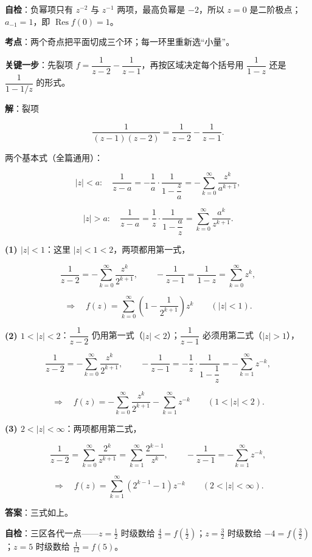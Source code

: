 \documentclass[11pt]{ctexart}
\renewcommand{\qbreak}{\needspace{0.45\textheight}}
\begin{document}
\textbf{自检}：负幂项只有 $z^{-2}$ 与 $z^{-1}$ 两项，最高负幂是 $-2$，所以 $z=0$ 是二阶极点；$a_{-1}=1$，即 $\operatorname{Res}f(0)=1$。

\qbreak
{}

\textbf{考点}：两个奇点把平面切成三个环；每一环里重新选“小量”。

\textbf{关键一步}：先裂项 $f=\dfrac{1}{z-2}-\dfrac{1}{z-1}$，再按区域决定每个括号用 $\dfrac{1}{1-z}$ 还是 $\dfrac{1}{1-1/z}$ 的形式。

\textbf{解}：裂项

\[ \frac{1}{(z-1)(z-2)}=\frac{1}{z-2}-\frac{1}{z-1} . \]

两个基本式（全篇通用）：

\[ |z|<a:\quad\frac{1}{z-a}=-\frac1a\cdot\frac{1}{1-\dfrac za}=-\sum_{k=0}^{\infty}\frac{z^k}{a^{k+1}} , \]

\[ |z|>a:\quad\frac{1}{z-a}=\frac1z\cdot\frac{1}{1-\dfrac az}=\sum_{k=0}^{\infty}\frac{a^k}{z^{k+1}} . \]

\textbf{(1) $|z|<1$}：这里 $|z|<1<2$，两项都用第一式，

\[ \frac{1}{z-2}=-\sum_{k=0}^{\infty}\frac{z^k}{2^{k+1}},\qquad -\frac{1}{z-1}=\frac{1}{1-z}=\sum_{k=0}^{\infty}z^k , \]

\[ \Longrightarrow\quad f(z)=\sum_{k=0}^{\infty}\left(1-\frac{1}{2^{k+1}}\right)z^k\qquad(|z|<1) . \]

\textbf{(2) $1<|z|<2$}：$\dfrac{1}{z-2}$ 仍用第一式（$|z|<2$）；$\dfrac{1}{z-1}$ 必须用第二式（$|z|>1$），

\[ \frac{1}{z-2}=-\sum_{k=0}^{\infty}\frac{z^k}{2^{k+1}},\qquad -\frac{1}{z-1}=-\frac1z\cdot\frac{1}{1-\dfrac1z}=-\sum_{k=1}^{\infty}z^{-k} , \]

\[ \Longrightarrow\quad f(z)=-\sum_{k=0}^{\infty}\frac{z^k}{2^{k+1}}-\sum_{k=1}^{\infty}z^{-k}\qquad(1<|z|<2) . \]

\textbf{(3) $2<|z|<\infty$}：两项都用第二式，

\[ \frac{1}{z-2}=\sum_{k=0}^{\infty}\frac{2^k}{z^{k+1}}=\sum_{k=1}^{\infty}\frac{2^{k-1}}{z^k},\qquad -\frac{1}{z-1}=-\sum_{k=1}^{\infty}z^{-k} , \]

\[ \Longrightarrow\quad f(z)=\sum_{k=1}^{\infty}\left(2^{k-1}-1\right)z^{-k}\qquad(2<|z|<\infty) . \]

\textbf{答案}：三式如上。

\textbf{自检}：三区各代一点——$z=\tfrac12$ 时级数给 $\tfrac43=f(\tfrac12)$；$z=\tfrac32$ 时级数给 $-4=f(\tfrac32)$；$z=5$ 时级数给 $\tfrac1{12}=f(5)$。
\end{document}
